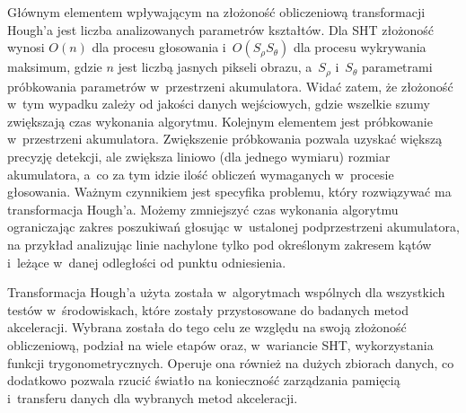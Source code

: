 Głównym elementem wpływającym na złożoność obliczeniową transformacji Hough'a jest liczba analizowanych parametrów kształtów. Dla SHT złożoność wynosi $O(n)$ dla procesu głosowania i~$O(S_\rho S_\theta)$ dla procesu wykrywania maksimum, gdzie $n$ jest liczbą jasnych pikseli obrazu, a~$S_\rho$ i~$S_\theta$ parametrami próbkowania parametrów w~przestrzeni akumulatora. Widać zatem, że złożoność w~tym wypadku zależy od jakości danych wejściowych, gdzie wszelkie szumy zwiększają czas wykonania algorytmu. Kolejnym elementem jest próbkowanie w~przestrzeni akumulatora. Zwiększenie próbkowania pozwala uzyskać większą precyzję detekcji, ale zwiększa liniowo (dla jednego wymiaru) rozmiar akumulatora, a~co za tym idzie ilość obliczeń wymaganych w~procesie głosowania. Ważnym czynnikiem jest specyfika problemu, który rozwiązywać ma transformacja Hough'a. Możemy zmniejszyć czas wykonania algorytmu ograniczając zakres poszukiwań głosując w~ustalonej podprzestrzeni akumulatora, na przykład analizując linie nachylone tylko pod określonym zakresem kątów i~leżące w~danej odległości od punktu odniesienia.

Transformacja Hough'a użyta została w~algorytmach wspólnych dla wszystkich testów w~środowiskach, które zostały przystosowane do badanych metod akceleracji. Wybrana została do tego celu ze względu na swoją złożoność obliczeniową, podział na wiele etapów oraz, w~wariancie SHT, wykorzystania funkcji trygonometrycznych. Operuje ona również na dużych zbiorach danych, co dodatkowo pozwala rzucić światło na konieczność zarządzania pamięcią i~transferu danych dla wybranych metod akceleracji. 
